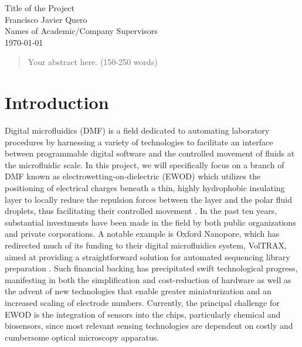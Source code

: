 \documentclass[10pt, twocolumn]{article}
\begin{document}
\begin{titlepage}
    \centering
    \vspace*{60px}
    \huge{Title of the Project}\\
    \vspace{10px}
    \large{Francisco Javier Quero}\\
    \large{Names of Academic/Company Supervisors}\\
    \vfill
    \today
    \vfill
\end{titlepage}

\clearpage
\onecolumn

\begin{abstract}
\noindent
Your abstract here. (150-250 words)
\end{abstract}

\clearpage
\twocolumn

\newpage
\section*{Introduction}

Digital microfluidics (DMF) is a field dedicated to automating laboratory procedures by harnessing a variety of technologies to facilitate an interface between programmable digital software and the controlled movement of fluids at the microfluidic scale.  In this project, we will specifically focus on a branch of DMF known as electrowetting-on-dielectric (EWOD) which utilizes the positioning of electrical charges beneath a thin, highly hydrophobic insulating layer to locally reduce the repulsion forces between the layer and the polar fluid droplets, thus facilitating their controlled movement \cite{beniContinuousElectrowettingEffect1982}. In the past ten years, substantial investments have been made in the field by both public organizations and private corporations. A notable example is Oxford Nanopore, which has redirected much of its funding to their digital microfluidics system, VolTRAX, aimed at providing a straightforward solution for automated sequencing library preparation \cite{VolTRAX2018,OxfordNanoporeAnnounces}. Such financial backing has precipitated swift technological progress, manifesting in both the simplification and cost-reduction of hardware \cite{zhang2DLargescaleEWOD2020} as well as the advent of new technologies that enable greater miniaturization and an increased scaling of electrode numbers\cite{qinSolutionMassProduction2021}. Currently, the principal challenge for EWOD is the integration of sensors into the chips, particularly chemical and biosensors, since most relevant sensing technologies are dependent on costly and cumbersome optical microscopy apparatus.
\end{document}
